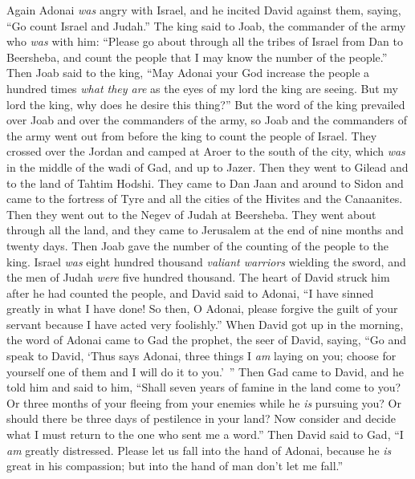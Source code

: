 \begin{biblechapter} %
 Again Adonai \textit{was} angry with Israel, and he incited David against them, saying, “Go count Israel and Judah.”
\verse The king said to Joab, the commander of the army who \textit{was} with him: “Please go about through all the tribes of Israel from Dan to Beersheba, and count the people that I may know the number of the people.”
\verse Then Joab said to the king, “May Adonai your God increase the people a hundred times \textit{what they are} as the eyes of my lord the king are seeing. But my lord the king, why does he desire this thing?”
\verse But the word of the king prevailed over Joab and over the commanders of the army, so Joab and the commanders of the army went out from before the king to count the people of Israel.
\verse They crossed over the Jordan and camped at Aroer to the south of the city, which \textit{was} in the middle of the wadi of Gad, and up to Jazer.
\verse Then they went to Gilead and to the land of Tahtim Hodshi. They came to Dan Jaan and around to Sidon
\verse and came to the fortress of Tyre and all the cities of the Hivites and the Canaanites. Then they went out to the Negev of Judah at Beersheba.
\verse They went about through all the land, and they came to Jerusalem at the end of nine months and twenty days.
\verse Then Joab gave the number of the counting of the people to the king. Israel \textit{was} eight hundred thousand \textit{valiant warriors} wielding the sword, and the men of Judah \textit{were} five hundred thousand.
\verse The heart of David struck him after he had counted the people, and David said to Adonai, “I have sinned greatly in what I have done! So then, O Adonai, please forgive the guilt of your servant because I have acted very foolishly.”
\verse When David got up in the morning, the word of Adonai came to Gad the prophet, the seer of David, saying,
\verse “Go and speak to David, ‘Thus says Adonai, three things I \textit{am} laying on you; choose for yourself one of them and I will do it to you.’ ”
\verse Then Gad came to David, and he told him and said to him, “Shall seven years of famine in the land come to you? Or three months of your fleeing from your enemies while he \textit{is} pursuing you? Or should there be three days of pestilence in your land? Now consider and decide what I must return to the one who sent me a word.”
\verse Then David said to Gad, “I \textit{am} greatly distressed. Please let us fall into the hand of Adonai, because he \textit{is} great in his compassion; but into the hand of man don’t let me fall.”

\end{biblechapter}
